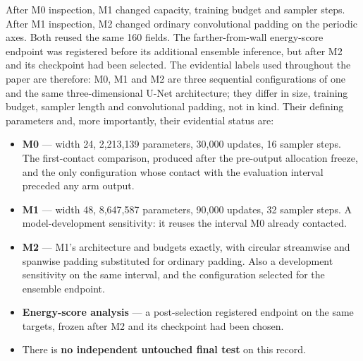 \documentclass[11pt]{article}
\begin{document}
After M0 inspection, M1 changed capacity, training budget and sampler steps. After M1 inspection,
M2 changed ordinary convolutional padding on the periodic axes. Both reused the same 160 fields.
The farther-from-wall energy-score endpoint was registered before its additional ensemble inference, but after
M2 and its checkpoint had been selected. The evidential labels used throughout the paper are
therefore:
M0, M1 and M2 are three sequential configurations of one and the same three-dimensional U-Net
architecture; they differ in size, training budget, sampler length and convolutional padding,
not in kind. Their defining parameters and, more importantly, their evidential status are:
\begin{itemize}
  \item \textbf{M0} --- width 24, 2,213,139 parameters, 30,000 updates, 16 sampler steps.
        The first-contact comparison, produced after the pre-output allocation freeze, and the
        only configuration whose contact with the evaluation interval preceded any arm output.
  \item \textbf{M1} --- width 48, 8,647,587 parameters, 90,000 updates, 32 sampler steps.
        A model-development sensitivity: it reuses the interval M0 already contacted.
  \item \textbf{M2} --- M1's architecture and budgets exactly, with circular streamwise and
        spanwise padding substituted for ordinary padding. Also a development sensitivity on
        the same interval, and the configuration selected for the ensemble endpoint.
  \item \textbf{Energy-score analysis} --- a post-selection registered endpoint on the same
        targets, frozen after M2 and its checkpoint had been chosen.
  \item There is \textbf{no independent untouched final test} on this record.
\end{itemize}
\end{document}
